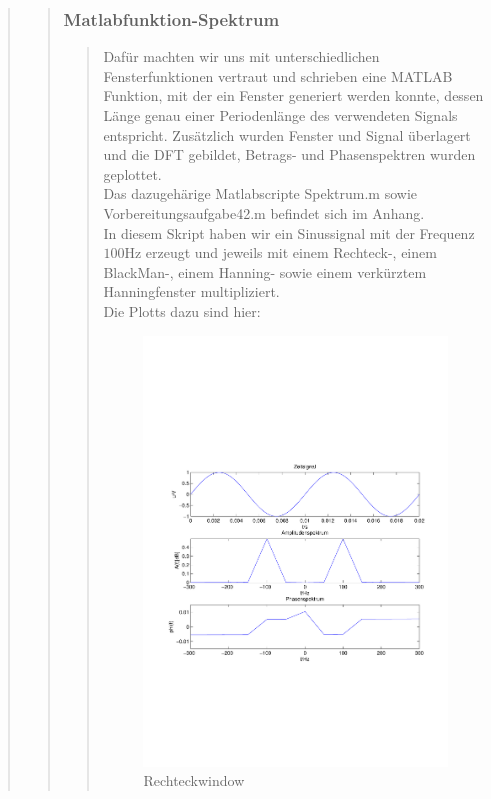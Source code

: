 \begin{quote}
\begin{quote}
        \subsubsection{Matlabfunktion-Spektrum}
		\begin{quote}
            Dafür machten wir uns mit unterschiedlichen Fensterfunktionen vertraut und schrieben eine MATLAB Funktion,
            mit der ein Fenster generiert werden konnte, dessen Länge genau einer Periodenlänge des verwendeten Signals
            entspricht. Zusätzlich wurden Fenster und Signal überlagert und die DFT gebildet, Betrags- und
            Phasenspektren wurden geplottet.\\
            Das dazugehärige Matlabscripte Spektrum.m sowie Vorbereitungsaufgabe42.m befindet sich im Anhang.\\
            In diesem Skript haben wir ein Sinussignal mit der Frequenz $100$Hz erzeugt und jeweils mit einem Rechteck-,
            einem BlackMan-, einem Hanning- sowie einem verkürztem Hanningfenster multipliziert.\\
            Die Plotts dazu sind hier:
            
            \begin{figure}[H]
            \centering
                \includegraphics[scale=0.5, trim = 1.5cm 7cm 1.5cm 8cm, clip]{./Bilder/Rechteckwindow}
                    \caption{Rechteckwindow}
            \end{figure}
            

\end{quote}
\end{quote}
\end{quote}
